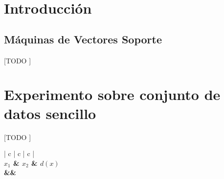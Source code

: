 \documentclass{article}
\begin{document}
	\maketitle %

	\thispagestyle{fancy} %



	\begin{abstract}
		\noindent [TODO ]
	\end{abstract}



	\section{Introducción}
	\label{sec:introducción}

		\subsection{Máquinas de Vectores Soporte}
		\label{sec:support-vector-machine}

			\paragraph{}
			[TODO ]

	\section{Experimento sobre conjunto de datos sencillo}
	\label{sec:e1}

		\paragraph{}
		[TODO ]

		\begin{table}[H]
			\centering
			\begin{tabu}{ | c | c | c |}
				\hline
				 \\ \hline
				\bfseries $x_1$ & \bfseries $x_2$ & \bfseries $d(x)$
				{\\\hline\one&\two&\three}
				\\\hline
			\end{tabu}
			\caption{Conjunto de datos Simple}
			\label{table:e1_dataset}
		\end{table}
\end{document}
